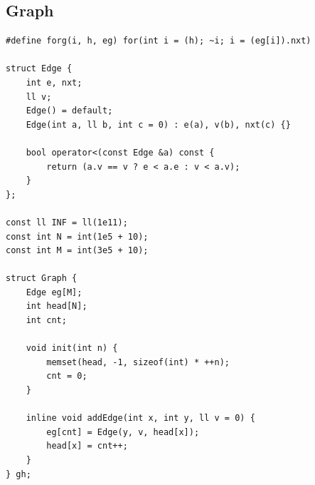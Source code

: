 \documentclass[twoside]{article}
\begin{document}
\subsection{Graph}
\begin{lstlisting}
#define forg(i, h, eg) for(int i = (h); ~i; i = (eg[i]).nxt)

struct Edge {
    int e, nxt;
    ll v;
    Edge() = default;
    Edge(int a, ll b, int c = 0) : e(a), v(b), nxt(c) {}

    bool operator<(const Edge &a) const {
        return (a.v == v ? e < a.e : v < a.v);
    }
};

const ll INF = ll(1e11);
const int N = int(1e5 + 10);
const int M = int(3e5 + 10);

struct Graph {
    Edge eg[M];
    int head[N];
    int cnt;

    void init(int n) {
        memset(head, -1, sizeof(int) * ++n);
        cnt = 0;
    }

    inline void addEdge(int x, int y, ll v = 0) {
        eg[cnt] = Edge(y, v, head[x]);
        head[x] = cnt++;
    }
} gh;\end{lstlisting}
\end{document}

